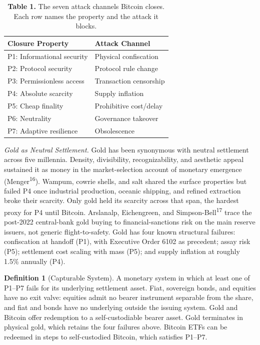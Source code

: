 \documentclass[12pt]{article}
\theoremstyle{definition}
\newtheorem{definition}{Definition}
\theoremstyle{remark}
\begin{document}
\begin{table}[h]
\centering
\caption*{\textbf{Table 1.} The seven attack channels Bitcoin closes. Each row names the property and the attack it blocks.}
\begin{tabular}{ll}
\toprule
Closure Property & Attack Channel \\
\midrule
P1: Informational security & Physical confiscation \\
P2: Protocol security & Protocol rule change \\
P3: Permissionless access & Transaction censorship \\
P4: Absolute scarcity & Supply inflation \\
P5: Cheap finality & Prohibitive cost/delay \\
P6: Neutrality & Governance takeover \\
P7: Adaptive resilience & Obsolescence \\
\bottomrule
\end{tabular}
\end{table}

\noindent\emph{Gold as Neutral Settlement.} Gold has been synonymous with neutral settlement across five millennia. Density, divisibility, recognizability, and aesthetic appeal sustained it as money in the market-selection account of monetary emergence (Menger\textsuperscript{16}). Wampum, cowrie shells, and salt shared the surface properties but failed P4 once industrial production, oceanic shipping, and refined extraction broke their scarcity. Only gold held its scarcity across that span, the hardest proxy for P4 until Bitcoin. Arslanalp, Eichengreen, and Simpson-Bell\textsuperscript{17} trace the post-2022 central-bank gold buying to financial-sanctions risk on the main reserve issuers, not generic flight-to-safety. Gold has four known structural failures: confiscation at handoff (P1), with Executive Order 6102 as precedent; assay risk (P5); settlement cost scaling with mass (P5); and supply inflation at roughly 1.5\% annually (P4).


\begin{definition}[Capturable System]
A monetary system in which at least one of P1--P7 fails for its
underlying settlement asset. Fiat, sovereign bonds, and equities
have no exit valve: equities admit no bearer instrument separable
from the share, and fiat and bonds have no underlying outside the
issuing system. Gold and Bitcoin offer redemption to a
self-custodiable bearer asset. Gold terminates in physical gold,
which retains the four failures above. Bitcoin ETFs can be
redeemed in steps to self-custodied Bitcoin, which satisfies P1--P7.
\end{definition}
\end{document}
